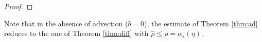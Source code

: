 \documentclass[10pt,a4paper]{article}
\newtheorem{remark}[theorem]{Remark}
\renewcommand{\epsilon}{\varepsilon}
\begin{document}
\begin{proof}
\end{proof}
Note that in the absence of advection ($b=0$), the estimate of Theorem \ref{thm:ad} reduces to the one of Theorem \ref{thm:diff} with $\hat \rho \leq \rho=\alpha_s(\eta)$. 

\end{document}
